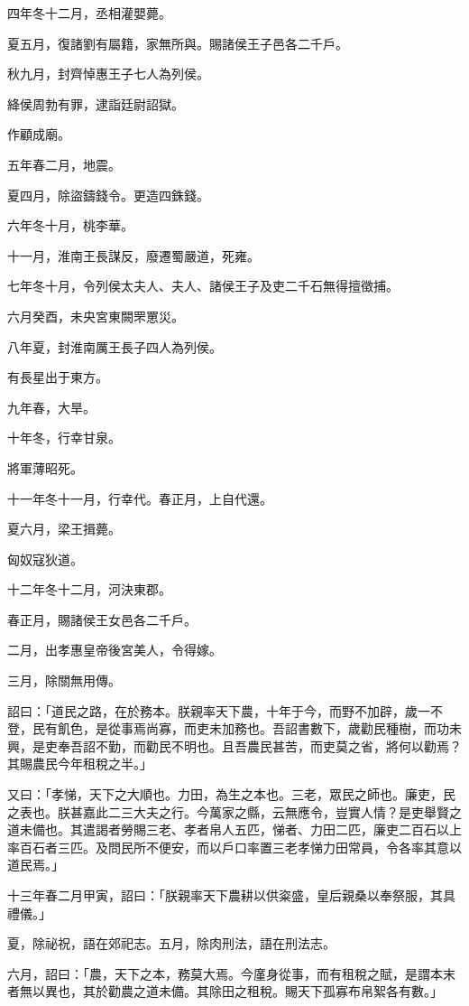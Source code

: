 \begin{pinyinscope}
四年冬十二月，丞相灌嬰薨。

夏五月，復諸劉有屬籍，家無所與。賜諸侯王子邑各二千戶。

秋九月，封齊悼惠王子七人為列侯。

絳侯周勃有罪，逮詣廷尉詔獄。

作顧成廟。

五年春二月，地震。

夏四月，除盜鑄錢令。更造四銖錢。

六年冬十月，桃李華。

十一月，淮南王長謀反，廢遷蜀嚴道，死雍。

七年冬十月，令列侯太夫人、夫人、諸侯王子及吏二千石無得擅徵捕。

六月癸酉，未央宮東闕罘罳災。

八年夏，封淮南厲王長子四人為列侯。

有長星出于東方。

九年春，大旱。

十年冬，行幸甘泉。

將軍薄昭死。

十一年冬十一月，行幸代。春正月，上自代還。

夏六月，梁王揖薨。

匈奴寇狄道。

十二年冬十二月，河決東郡。

春正月，賜諸侯王女邑各二千戶。

二月，出孝惠皇帝後宮美人，令得嫁。

三月，除關無用傳。

詔曰：「道民之路，在於務本。朕親率天下農，十年于今，而野不加辟，歲一不登，民有飢色，是從事焉尚寡，而吏未加務也。吾詔書數下，歲勸民種樹，而功未興，是吏奉吾詔不勤，而勸民不明也。且吾農民甚苦，而吏莫之省，將何以勸焉？其賜農民今年租稅之半。」

又曰：「孝悌，天下之大順也。力田，為生之本也。三老，眾民之師也。廉吏，民之表也。朕甚嘉此二三大夫之行。今萬家之縣，云無應令，豈實人情？是吏舉賢之道未備也。其遣謁者勞賜三老、孝者帛人五匹，悌者、力田二匹，廉吏二百石以上率百石者三匹。及問民所不便安，而以戶口率置三老孝悌力田常員，令各率其意以道民焉。」

十三年春二月甲寅，詔曰：「朕親率天下農耕以供粢盛，皇后親桑以奉祭服，其具禮儀。」

夏，除祕祝，語在郊祀志。五月，除肉刑法，語在刑法志。

六月，詔曰：「農，天下之本，務莫大焉。今廑身從事，而有租稅之賦，是謂本末者無以異也，其於勸農之道未備。其除田之租稅。賜天下孤寡布帛絮各有數。」


\end{pinyinscope}
